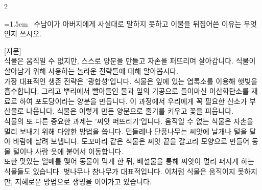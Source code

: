 \documentclass[11pt, a4paper]{article}
\begin{document}
\begin{multicols}{2}
\begin{minipage}{\columnwidth}
\vspace{3mm}
\noindent\hrulefill
\vspace{2.5mm}
\noindent\hrulefill
\vspace{2.5mm}
\noindent\hrulefill
\vspace{2.5mm}
\noindent\hrulefill
\vspace{2.5mm}
\noindent\hrulefill
\vspace{2.5mm}
\vspace{1mm}
\vspace{4mm}
\end{minipage}
\par

\noindent\begin{minipage}{\columnwidth}
\vspace{2mm}
{\hangindent=1.5em  ~수남이가 아버지에게 사실대로 말하지 못하고 이불을 뒤집어쓴 이유는 무엇인지 쓰시오.\par}

\vspace{3mm}
\noindent\hrulefill
\vspace{2.5mm}
\noindent\hrulefill
\vspace{2.5mm}
\noindent\hrulefill
\vspace{2.5mm}
\noindent\hrulefill
\vspace{2.5mm}
\noindent\hrulefill
\vspace{2.5mm}
\vspace{1mm}
\vspace{4mm}
\end{minipage}
\par


\vspace{1mm}
\vspace{0.5mm}

\begin{passagebox}
\noindent{}[지문] \\
식물은 움직일 수 없지만, 스스로 양분을 만들고 자손을 퍼뜨리며 살아갑니다. 식물이 살아남기 위해 사용하는 놀라운 전략들에 대해 알아봅시다.
\\[0.5em]
가장 대표적인 생존 전략은 '광합성'입니다. 식물은 잎에 있는 엽록소를 이용해 햇빛을 흡수합니다. 그리고 뿌리에서 빨아들인 물과 잎의 기공으로 들이마신 이산화탄소를 재료로 하여 포도당이라는 양분을 만듭니다. 이 과정에서 우리에게 꼭 필요한 산소가 부산물로 나옵니다. 식물은 이렇게 만든 양분으로 줄기를 키우고 꽃을 피웁니다.
\\[0.5em]
식물의 또 다른 중요한 과제는 '씨앗 퍼뜨리기'입니다. 움직일 수 없는 식물은 자손을 멀리 보내기 위해 다양한 방법을 씁니다. 민들레나 단풍나무는 씨앗에 날개나 털을 달아 바람에 날려 보냅니다. 도꼬마리 같은 식물은 씨앗 끝을 갈고리 모양으로 만들어 동물 털이나 사람 옷에 붙어서 이동합니다.
\\[0.5em]
또한 맛있는 열매를 맺어 동물이 먹게 한 뒤, 배설물을 통해 씨앗이 멀리 퍼지게 하는 식물들도 있습니다. 벚나무나 참나무가 대표적입니다. 이처럼 식물은 움직이지 못하지만, 지혜로운 방법으로 생명을 이어가고 있습니다.
\end{passagebox}
\vspace{1mm}


\end{multicols}
\end{document}

